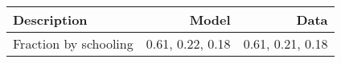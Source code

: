 \begin{tabular}{lrr}
\hline
Description & Model  & Data  \\ 
\hline
Fraction by schooling & 0.61, 0.22, 0.18  & 0.61, 0.21, 0.18  \\ 
\hline
\end{tabular}%
